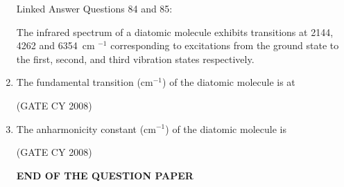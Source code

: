 \documentclass[12pt]{article}
\begin{document}
\begin{enumerate}
    

Linked Answer Questions 84 and 85:

The infrared spectrum of a diatomic molecule exhibits transitions at 2144, 4262 and 6354~cm $^{-1}$ 
corresponding to excitations from the ground state to the first, second, and third vibration states respectively.

\item  The fundamental transition (cm$^{-1}$) of the diatomic molecule is at
\begin{enumerate}
   \hfill{(GATE CY 2008)}
\end{enumerate}

\item  The anharmonicity constant (cm$^{-1}$) of the diatomic molecule is
\begin{enumerate}
   \hfill{(GATE CY 2008)}
\end{enumerate}

\begin{center}
\textbf{END OF THE QUESTION PAPER}
\end{center}

\end{enumerate}
\end{document}
